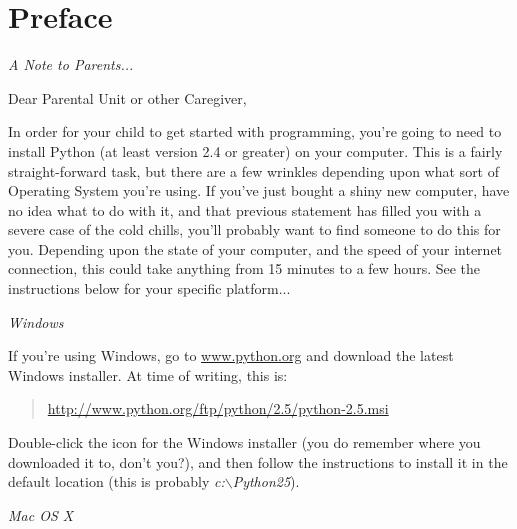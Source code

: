 

\chapter*{Preface}\normalsize
\begin{center}
{\em A Note to Parents...}
\end{center}
\pagestyle{plain}

\noindent
Dear Parental Unit or other Caregiver,

In order for your child to get started with programming, you're going to need to install Python (at least version 2.4 or greater) on your computer.
This is a fairly straight-forward task, but there are a few wrinkles depending upon what sort of Operating System you're using.  If you've just bought a shiny new computer, have no idea what to do with it, and that previous statement has filled you with a severe case of the cold chills, you'll probably want to find someone to do this for you.  Depending upon the state of your computer, and the speed of your internet connection, this could take anything from 15 minutes to a few hours.  See the instructions below for your specific platform...

\noindent
\emph{\color{BrickRed}Windows}

If you're using Windows, go to \href{http://www.python.org}{www.python.org} and download the latest Windows installer.  At time of writing, this is:
\begin{quote}
     \href{http://www.python.org/ftp/python/2.5/python-2.5.msi}{http://www.python.org/ftp/python/2.5/python-2.5.msi}
\end{quote}
Double-click the icon for the Windows installer (you do remember where you downloaded it to, don't you?), and then follow the instructions to install it in the default location (this is probably \emph{c:$\backslash$Python25}).

\noindent
\emph{\color{BrickRed}Mac OS X}

